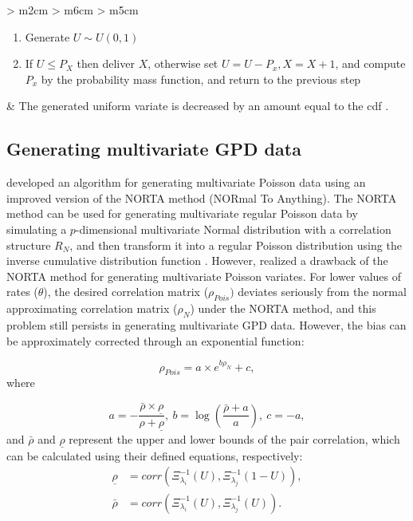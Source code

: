 \begin{longtable}[H]{ >
    {} m{2cm} >
    {} m{6cm} >
    {} m{5cm}}
\begin{enumerate}
                \item Generate $U \sim U(0, 1)$
                \item If $U \le P_X$ then deliver $X$, otherwise set $U = U - P_x, X = X + 1$, and compute $P_x$ by the probability mass function, and return to the previous step
            \end{enumerate}
        & The generated uniform variate is decreased by an amount equal to the cdf \citep{Kemp1981}. \\
        \bottomrule
\end{longtable}

\subsection{Generating multivariate GPD data}

\cite{yahav2012generating} developed an algorithm for generating multivariate Poisson data using an improved version of the NORTA method (NORmal To Anything). The NORTA method can be used for generating multivariate regular Poisson data by simulating a $p$-dimensional multivariate Normal distribution with a correlation structure $R_N$, and then transform it into a regular Poisson distribution using the inverse cumulative distribution function \citep{chen2001initialization}. However, \cite{yahav2012generating} realized a drawback of the NORTA method for generating multivariate Poisson variates. For lower values of rates ($\theta$), the desired correlation matrix ($\rho_{Pois})$ deviates seriously from the normal approximating correlation matrix ($\rho_{N}$) under the NORTA method, and this problem still persists in generating multivariate GPD data. However, the bias can be approximately corrected through an exponential function:

\begin{equation*}
\label{eq-1a}
\rho_{Pois} = a \times e^{b\rho_N} + c,
\end{equation*}
where 

\begin{equation*}
a = -\frac{\bar{\rho}\times\underline{\rho}}{\rho+\underline{\rho}}, \ b = \log\left(\frac{\bar{\rho}+a}{a}\right), \ c = -a,
\end{equation*}
and $\bar{\rho}$ and $\underline{\rho}$ represent the upper and lower bounds of the pair correlation, which can be calculated using their defined equations, respectively:
\begin{align*}
    \underline{\rho} &= corr\left(\Xi_{\lambda_i}^{-1}\left(U\right), \Xi_{\lambda_j}^{-1}\left(1 - U\right)\right), \\
    \bar{\rho} &= corr\left(\Xi_{\lambda_i}^{-1}\left(U\right),\Xi_{\lambda_{j}}^{-1}\left(U\right)\right).
\end{align*}

